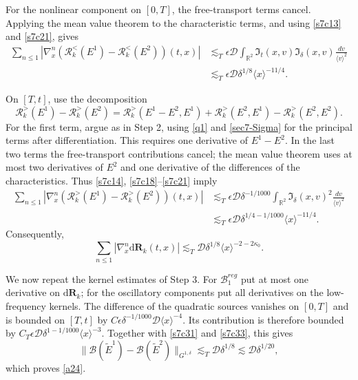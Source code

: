 \documentclass[reqno,11pt]{amsart}
\numberwithin{equation}{section}
\def\R{{\mathbb R}}
\def\R{{\bf R}}
\def\R{\mathbb{R}}
\begin{document}
For the nonlinear component on $[0,T]$, the free-transport
terms cancel. Applying the mean value theorem to the
characteristic terms, and using \eqref{s7c13} and
\eqref{s7c21}, gives
\[
\begin{split}
\sum_{n\leq1}
|\nabla_x^n(\mathcal R_k^<(E^1)-\mathcal R_k^<(E^2))(t,x)|&\lesssim_T\epsilon\mathcal D
\int_{\R^2}\mathfrak I_t(x,v)\mathfrak I_\delta(x,v)
\frac{dv}{\langle v\rangle^2}\\
&\lesssim_T\epsilon\mathcal D\delta^{1/8}
\langle x\rangle^{-11/4}.
\end{split}
\]

On $[T,t]$, use the decomposition
\[
\mathcal R_k^>(E^1)-\mathcal R_k^>(E^2)
=\mathcal R_k^>(E^1-E^2,E^1)
+\mathcal R_k^>(E^2,E^1)-\mathcal R_k^>(E^2,E^2).
\]
For the first term, argue as in Step 2, using
\eqref{q1} and \eqref{sec7-Sigma} for the principal terms
after differentiation. This requires one derivative
of $E^1-E^2$. In the last two terms the free-transport contributions cancel;
the mean value theorem uses at most two derivatives of $E^2$
and one derivative of the differences of the characteristics.
Thus \eqref{s7c14}, \eqref{s7c18}--\eqref{s7c21} imply
\[
\begin{split}
\sum_{n\leq1}
|\nabla_x^n(\mathcal R_k^>(E^1)-\mathcal R_k^>(E^2))(t,x)|&\lesssim_T\epsilon\mathcal D\delta^{-1/1000}
\int_{\R^2}\mathfrak I_\delta(x,v)^2
\frac{dv}{\langle v\rangle^2}\\
&\lesssim_T\epsilon\mathcal D\delta^{1/4-1/1000}
\langle x\rangle^{-11/4}.
\end{split}
\]
Consequently,
\begin{equation}\label{s7c33}
\sum_{n\leq1}|\nabla_x^n\mathrm d\mathbf R_k(t,x)|
\lesssim_T\mathcal D\delta^{1/8}
\langle x\rangle^{-2-2\kappa_0}.
\end{equation}

We now repeat the kernel estimates of Step 3.
For $\mathcal B_1^{reg}$ put at most one derivative on
$\mathrm d\mathbf R_k$; for the oscillatory components
put all derivatives on the low-frequency kernels.
The difference of the quadratic sources vanishes on $[0,T]$
and is bounded on $[T,t]$ by
$C\epsilon\delta^{-1/1000}\mathcal D\langle x\rangle^{-4}$.
Its contribution is therefore bounded by
$C_T\epsilon\mathcal D\delta^{1-1/1000}
\langle x\rangle^{-3}$.
Together with \eqref{s7c31} and \eqref{s7c33}, this gives
\[
\|\mathcal B(\tilde E^1)-\mathcal B(\tilde E^2)\|_{G^{1,\delta}}
\lesssim_T\mathcal D\delta^{1/8}
\lesssim\mathcal D\delta^{1/20},
\]
which proves \eqref{a24}.
\medskip
\end{document}
